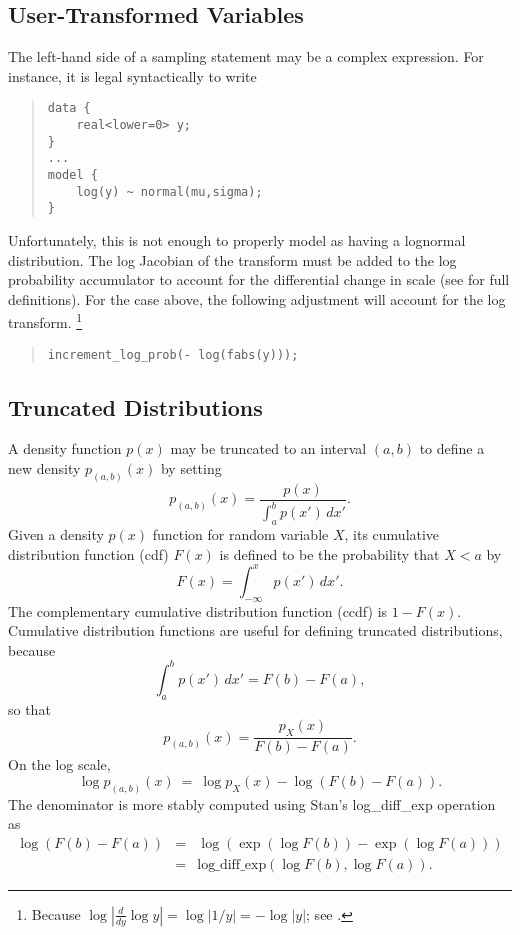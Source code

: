 \subsection{User-Transformed Variables}

The left-hand side of a sampling statement may be a complex
expression.  For instance, it is legal syntactically to write
%
\begin{quote}
\begin{Verbatim}[fontsize=\small]
data {
    real<lower=0> y;
}
...
model {
    log(y) ~ normal(mu,sigma);
}
\end{Verbatim}
\end{quote}
%
Unfortunately, this is not enough to properly model  as having
a lognormal distribution.  The log Jacobian of the transform must be
added to the log probability accumulator to account for the
differential change in scale (see  for
full definitions).  For the case above, the following adjustment will
account for the log transform.%
%
\footnote{Because $\log | \frac{d}{dy} \log y | = \log | 1/y | = - \log
  |y|$;  see .}
%
\begin{quote}
\begin{Verbatim}[fontsize=\small]
increment_log_prob(- log(fabs(y)));
\end{Verbatim}
\end{quote}
%

\subsection{Truncated Distributions}\label{truncated-distributions.section}

A density function $p(x)$ may be truncated to an interval $(a,b)$ to
define a new density $p_{(a,b)}\!(x)$ by setting
%
\[ 
p_{\!(a,b)\!}(x) = \frac{p(x)}
                  {\int_a^b p(x') \, dx'}.
\] 
Given a density $p(x)$ function for random variable $X$, its
cumulative distribution function (cdf) $F(x)$ is defined to be the
probability that $X < a$ by
\[
F(x) = \int_{-\infty}^{x} p(x') \, dx'.
\]
%
The complementary cumulative distribution function (ccdf) is $1 -
F(x)$.  Cumulative distribution functions are useful for defining
truncated distributions, because
\[
\int_a^b p(x') \, dx' = F(b) - F(a),
\]
so that
\[ 
p_{\!(a,b)\!}(x) = \frac{p_X(x)}
                  {F(b) - F(a)}.
\] 
On the log scale,
\[ 
\log p_{\!(a,b)\!}(x) 
\ = \ 
\log p_X(x)
- \log \left( F(b) - F(a) \right).
\]
The denominator is more stably computed using Stan's
log\_diff\_exp operation as
\begin{eqnarray*}
\log \left( F(b) - F(a) \right)
& = & \log \left( \exp(\log F(b)) - \exp(\log F(a)) \right)
\\[6pt]
& = & \mbox{log\_diff\_exp}\!\left( \log F(b), \log F(a) \right).
\end{eqnarray*}



